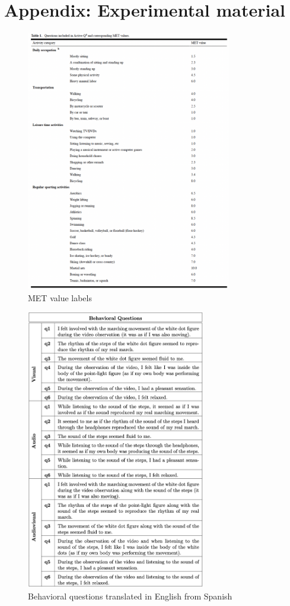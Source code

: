 \chapter*{Appendix: Experimental material}
\begin{figure}[ht]
    \centering
    \includegraphics[width=0.8\textwidth]{appendix/met_values.png}
    \caption{MET value labels \parencite{Bonn_2012}}
    \label{fig: met_values}
\end{figure}
\begin{figure}[ht]
    \centering
    \includegraphics[width=0.70\textwidth]{appendix/questions.png}
    \caption{Behavioral questions translated in English from Spanish}
    \label{fig: Behavioral questions}
\end{figure}

